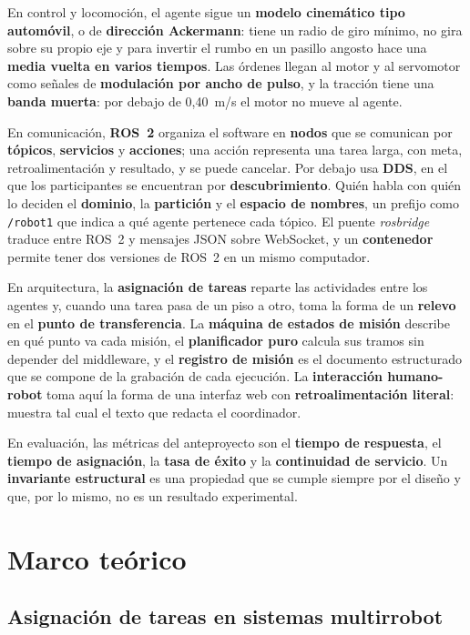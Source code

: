 En control y locomoción, el agente sigue un \textbf{modelo cinemático tipo automóvil}, o de \textbf{dirección Ackermann}: tiene un radio de giro mínimo, no gira sobre su propio eje y para invertir el rumbo en un pasillo angosto hace una \textbf{media vuelta en varios tiempos}. Las órdenes llegan al motor y al servomotor como señales de \textbf{modulación por ancho de pulso}, y la tracción tiene una \textbf{banda muerta}: por debajo de 0,40~m/s el motor no mueve al agente.

En comunicación, \textbf{ROS~2} organiza el software en \textbf{nodos} que se comunican por \textbf{tópicos}, \textbf{servicios} y \textbf{acciones}; una acción representa una tarea larga, con meta, retroalimentación y resultado, y se puede cancelar. Por debajo usa \textbf{DDS}, en el que los participantes se encuentran por \textbf{descubrimiento}. Quién habla con quién lo deciden el \textbf{dominio}, la \textbf{partición} y el \textbf{espacio de nombres}, un prefijo como \texttt{/robot1} que indica a qué agente pertenece cada tópico. El puente \textit{rosbridge} traduce entre ROS~2 y mensajes JSON sobre WebSocket, y un \textbf{contenedor} permite tener dos versiones de ROS~2 en un mismo computador.

En arquitectura, la \textbf{asignación de tareas} reparte las actividades entre los agentes y, cuando una tarea pasa de un piso a otro, toma la forma de un \textbf{relevo} en el \textbf{punto de transferencia}. La \textbf{máquina de estados de misión} describe en qué punto va cada misión, el \textbf{planificador puro} calcula sus tramos sin depender del middleware, y el \textbf{registro de misión} es el documento estructurado que se compone de la grabación de cada ejecución. La \textbf{interacción humano-robot} toma aquí la forma de una interfaz web con \textbf{retroalimentación literal}: muestra tal cual el texto que redacta el coordinador.

En evaluación, las métricas del anteproyecto son el \textbf{tiempo de respuesta}, el \textbf{tiempo de asignación}, la \textbf{tasa de éxito} y la \textbf{continuidad de servicio}. Un \textbf{invariante estructural} es una propiedad que se cumple siempre por el diseño y que, por lo mismo, no es un resultado experimental.

\section{Marco teórico}
\label{sec:teorico}

\subsection{Asignación de tareas en sistemas multirrobot}


